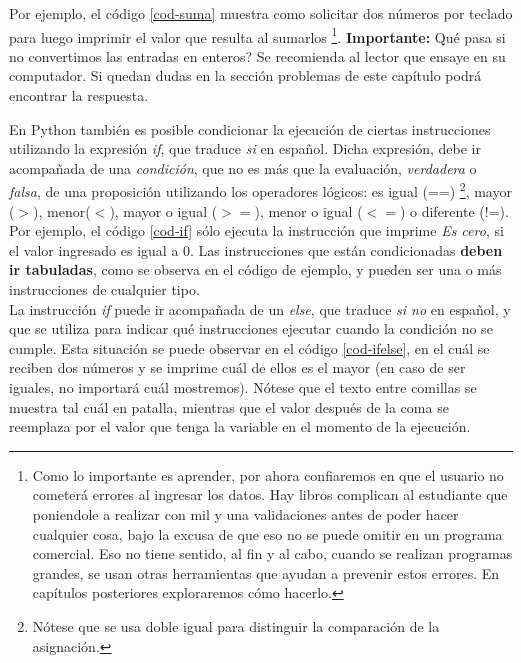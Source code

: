  Por ejemplo, el código \ref{cod-suma} muestra como solicitar dos números por teclado para luego imprimir el valor que resulta al sumarlos \footnote{Como lo importante es aprender, por ahora confiaremos en que el usuario no cometerá errores al ingresar los datos. Hay libros complican al estudiante que poniendole a realizar con mil y una validaciones antes de poder hacer cualquier cosa, bajo la excusa de que eso no se puede omitir en un programa comercial. Eso no tiene sentido, al fin y al cabo, cuando se realizan programas grandes, se usan otras herramientas que ayudan a prevenir estos errores. En capítulos posteriores exploraremos cómo hacerlo.}. \textbf{Importante:} Qué pasa si no convertimos las entradas en enteros? Se recomienda al lector que ensaye en su computador. Si quedan dudas en la sección problemas de este capítulo podrá encontrar la respuesta. \\

\newpage



En Python también es posible condicionar la ejecución de ciertas instrucciones utilizando la expresión \emph{if}, que traduce \emph{si} en español. Dicha expresión, debe ir acompañada de una \emph{condición}, que no es más que la evaluación, \emph{verdadera} o \emph{falsa}, de una proposición utilizando los operadores lógicos: es igual (==) \footnote{Nótese que se usa doble igual para distinguir la comparación de la asignación.}, mayor ($>$), menor($<$), mayor o igual ($>=$), menor o igual ($<=$) o diferente (!=). Por ejemplo, el código \ref{cod-if} sólo ejecuta la instrucción que imprime \emph{Es cero}, si  el valor ingresado es igual a 0. Las instrucciones que están condicionadas \textbf{deben ir tabuladas}, como se observa en el código de ejemplo, y pueden ser una o más instrucciones de cualquier tipo. \\




La instrucción \emph{if} puede ir acompañada de un \emph{else}, que traduce \emph{si no} en español, y que se utiliza para indicar qué instrucciones ejecutar cuando la condición no se cumple. Esta situación se puede observar en el código \ref{cod-ifelse}, en el cuál se reciben dos números y se imprime cuál de ellos es el mayor (en caso de ser iguales, no importará cuál mostremos). Nótese que el texto entre comillas se muestra tal cuál en patalla, mientras que el valor después de la coma se reemplaza por el valor que tenga la variable en el momento de la ejecución. \\

